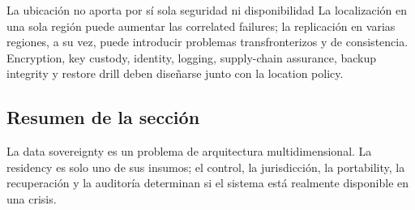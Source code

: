 \begin{warningbox}{La ubicación no aporta por sí sola seguridad ni disponibilidad}
La localización en una sola región puede aumentar las correlated failures; la replicación en varias regiones, a su vez, puede introducir problemas transfronterizos y de consistencia. Encryption, key custody, identity, logging, supply-chain assurance, backup integrity y restore drill deben diseñarse junto con la location policy.
\end{warningbox}


\subsection{Resumen de la sección}

La data sovereignty es un problema de arquitectura multidimensional. La residency es solo uno de sus insumos; el control, la jurisdicción, la portability, la recuperación y la auditoría determinan si el sistema está realmente disponible en una crisis.
